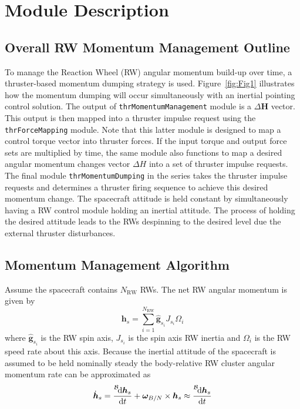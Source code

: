 \documentclass[]{BasiliskReportMemo}
\begin{document}
\section{Module Description}
\subsection{Overall RW Momentum Management Outline}
To manage the Reaction Wheel (RW) angular momentum build-up over time, a thruster-based momentum dumping strategy is used.  Figure~\ref{fig:Fig1} illustrates how the momentum dumping will occur simultaneously with an inertial pointing control solution.   The output of {\tt thrMomentumManagement} module is a $\Delta \bm H$ vector.  This output is then mapped into a thruster impulse request using the {\tt thrForceMapping} module.  Note that this latter module is designed to map a control torque vector into thruster forces.  If the input torque and output force sets are multiplied by time,  the same module also functions to map a desired angular momentum changes vector $\Delta H$ into a set of thruster impulse requests.  The final module {\tt thrMomentumDumping} in the series takes the thruster impulse requests and determines a thruster firing sequence to achieve this desired momentum change.  The spacecraft attitude is held constant by simultaneously having a RW control module holding an inertial attitude.  The process of holding the desired attitude leads to the RWs despinning to the desired level due the external thruster disturbances.  


\subsection{Momentum Management Algorithm}
Assume the spacecraft contains $N_{\text{RW}}$ RWs. The net RW angular momentum is given by
\begin{equation}
	\bm h_{s} = \sum_{i=1}^{N_{\text{RW}}} \hat{\bm g}_{s_{i}} J_{s_{i}} \Omega_{i}
\end{equation} 
where $\hat{\bm g}_{s_{i}}$ is the RW spin axis, $J_{s_{i}}$ is the spin axis RW inertia and $\Omega_{i}$ is the RW speed rate about this axis.  
Because the inertial attitude of the spacecraft is assumed to be held nominally steady the body-relative RW cluster angular momentum rate can be approximated as 
\begin{equation}
	\dot{\bm h}_{s} = \frac{\leftexp{B}{\D}\bm h_{s}}{\D t} + \bm\omega_{B/N} \times \bm h_{s} \approx \frac{\leftexp{B}{\D}\bm h_{s}}{\D t}
\end{equation}
\end{document}
